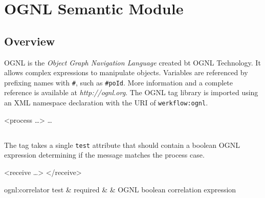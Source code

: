 \chapter{OGNL Semantic Module}

\section{Overview}

OGNL is the \emph{Object Graph Navigation Language}
created bt OGNL Technology.  It allows complex expressions to
manipulate objects.  Variables are referenced by prefixing
names with \verb|#|, such as \verb|#poId|.  More information
and a complete reference is available at \emph{http://ognl.org}.
The OGNL tag library is imported using an XML namespace
declaration with the URI of \verb|werkflow:ognl|.

\begin{codelisting}
<process  \dots>
    \dots
\end{codelisting}


\section{}

The  tag takes a single \verb|test| attribute
that should contain a boolean OGNL expression determining if
the message matches the process case.

\begin{codelisting}
<receive \dots>
</receive>
\end{codelisting}

\begin{attrDefs}{ognl:correlator}
test		&	required	&			& OGNL boolean correlation expression \\
\end{attrDefs}
